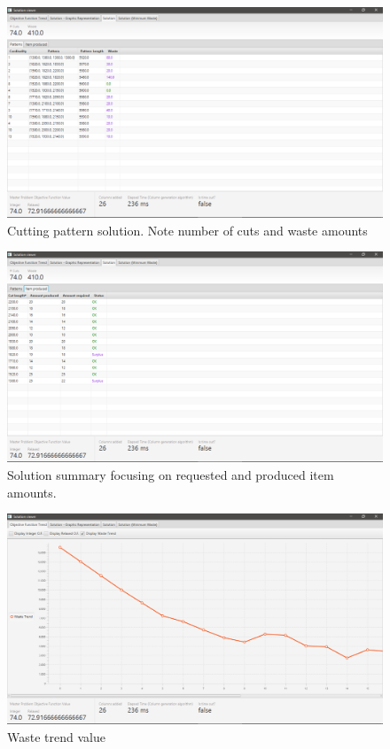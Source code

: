 \documentclass[10pt,a4paper]{article}
\begin{document}
\begin{figure}[H]
\includegraphics[width=\textwidth]{./images/sol1.png}
\centering
\caption{Cutting pattern solution. Note number of cuts and waste amounts}

\end{figure}


\begin{figure}[H]
\includegraphics[width=\textwidth]{./images/sol2.png}
\centering
\caption{Solution summary focusing on requested and produced item amounts.}

\end{figure}

\begin{figure}[H]
\includegraphics[width=\textwidth]{./images/waste.png}
\centering
\caption{Waste trend value}

\end{figure}
\end{document}
